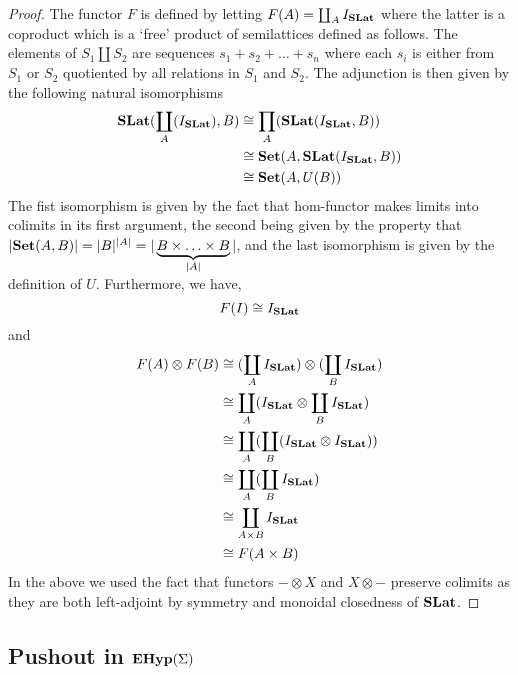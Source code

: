     \begin{proof}
      The functor $F$ is defined by letting $F(A) = \coprod_{A} I_{\mathbf{SLat}}$ where the latter is a coproduct which is a `free' product of semilattices defined as follows.
      The elements of $S_{1} \coprod S_{2}$ are sequences $s_{1} + s_{2} + \ldots + s_{n}$ where each $s_{i}$ is either from $S_{1}$ or $S_{2}$ quotiented by all relations in $S_{1}$ and $S_{2}$.
      The adjunction is then given by the following natural isomorphisms
      \begin{align*}
      \mathbf{SLat}(\coprod_{A}(I_{\mathbf{SLat}}), B) &\cong \prod_{A}(\mathbf{SLat}(I_{\mathbf{SLat}}, B))\\
                                                         &\cong \mathbf{Set}(A,\mathbf{SLat}(I_{\mathbf{SLat}}, B))\\
                                                         &\cong \mathbf{Set}(A, U(B))
      \end{align*}
      The fist isomorphism is given by the fact that hom-functor makes limits into colimits in its first argument, the second being given by the property that $|\mathbf{Set}(A,B)| = |B|^{|A|} = |\underbrace{B \times \ldots \times B}_{|A|}|$, and the last isomorphism is given by the definition of $U$.
      Furthermore, we have, 
      \[
      F(I) \cong I_{\mathbf{SLat}}
      \]
      and 
      \begin{align*}
      F(A) \otimes F(B) &\cong (\coprod_{A} I_{\mathbf{SLat}}) \otimes (\coprod_{B} I_{\mathbf{SLat}})\\
            &\cong \coprod_{A} (I_{\mathbf{SLat}} \otimes \coprod_{B} I_{\mathbf{SLat}})\\
            &\cong \coprod_{A} (\coprod_{B} (I_{\mathbf{SLat}} \otimes I_{\mathbf{SLat}}))\\
            &\cong \coprod_{A} (\coprod_{B} I_{\mathbf{SLat}})\\
            &\cong \coprod_{A \times B} I_{\mathbf{SLat}}\\
            &\cong F(A \times B)
      \end{align*}
    In the above we used the fact that functors $- \otimes X$ and $X \otimes -$ preserve colimits as they are both left-adjoint by symmetry and monoidal closedness of $\mathbf{SLat}$.
    \end{proof}

\subsection{Pushout in $\mathbf{EHyp}(\Sigma)$}
\label{sec:appendix:pushout}

